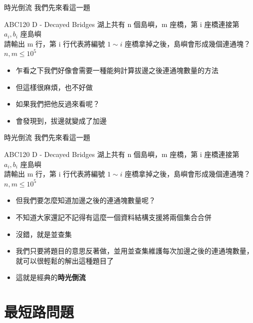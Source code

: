 \documentclass[aspectratio=169]{beamer}
\begin{document}
    \begin{frame}{時光倒流}
        我們先來看這一題
        \begin{block}{ABC120 D - Decayed Bridges}
            湖上共有 n 個島嶼，m 座橋，第 i 座橋連接第 $a_i, b_i$ 座島嶼\\
            請輸出 m 行，第 i 行代表將編號 $1 \sim i$ 座橋拿掉之後，島嶼會形成幾個連通塊？ $n, m \le 10^5$
        \end{block}

        \begin{itemize}
            \item<2-> 乍看之下我們好像會需要一種能夠計算拔邊之後連通塊數量的方法
            \item<3-> 但這樣很麻煩，也不好做
            \item<4-> 如果我們把他反過來看呢？
            \item<5-> 會發現到，拔邊就變成了加邊
        \end{itemize}
    \end{frame}

    \begin{frame}{時光倒流}
        我們先來看這一題
        \begin{block}{ABC120 D - Decayed Bridges}
            湖上共有 n 個島嶼，m 座橋，第 i 座橋連接第 $a_i, b_i$ 座島嶼\\
            請輸出 m 行，第 i 行代表將編號 $1 \sim i$ 座橋拿掉之後，島嶼會形成幾個連通塊？ $n, m \le 10^5$
        \end{block}

        \begin{itemize}
            \item<1-> 但我們要怎麼知道加邊之後的連通塊數量呢？
            \item<2-> 不知道大家還記不記得有這麼一個資料結構支援將兩個集合合併
            \item<3-> 沒錯，就是並查集
            \item<4-> 我們只要將題目的意思反著做，並用並查集維護每次加邊之後的連通塊數量，就可以很輕鬆的解出這種題目了
            \item<5-> 這就是經典的\textbf{時光倒流}
        \end{itemize}
    \end{frame}

    \section{最短路問題}
\end{document}
